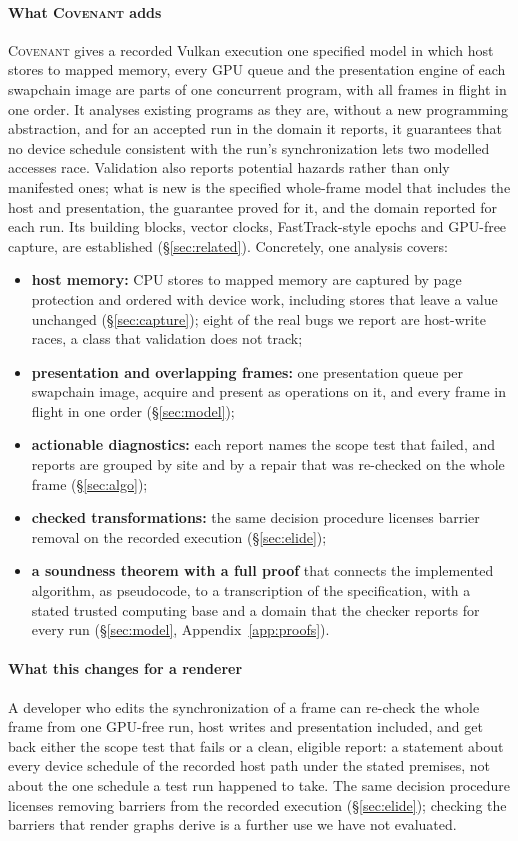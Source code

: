 \documentclass[acmtog,anonymous,review]{acmart}
\newcommand{\sys}{\textsc{Covenant}\xspace}
\begin{document}
\paragraph{What \sys adds}
\sys gives a recorded Vulkan execution one specified model in which host stores to mapped memory, every GPU queue
and the presentation engine of each swapchain image are parts of one concurrent program, with all frames in flight
in one order. It analyses existing programs as they are, without a new programming abstraction, and for an accepted
run in the domain it reports, it guarantees that no device schedule consistent with the run's synchronization lets
two modelled accesses race. Validation also reports potential hazards rather than only manifested ones; what is new
is the specified whole-frame model that includes the host and presentation, the guarantee proved for it, and the
domain reported for each run. Its building blocks, vector clocks, FastTrack-style epochs and GPU-free capture, are
established (\S\ref{sec:related}). Concretely, one analysis covers:
\begin{itemize}
\item \textbf{host memory:} CPU stores to mapped memory are captured by page protection and ordered with device
  work, including stores that leave a value unchanged (\S\ref{sec:capture}); eight of the real bugs we report are
  host-write races, a class that validation does not track;
\item \textbf{presentation and overlapping frames:} one presentation queue per swapchain image, acquire and present
  as operations on it, and every frame in flight in one order (\S\ref{sec:model});
\item \textbf{actionable diagnostics:} each report names the scope test that failed, and reports are grouped by site
  and by a repair that was re-checked on the whole frame (\S\ref{sec:algo});
\item \textbf{checked transformations:} the same decision procedure licenses barrier removal on the recorded
  execution (\S\ref{sec:elide});
\item \textbf{a soundness theorem with a full proof} that connects the implemented algorithm, as pseudocode, to a
  transcription of the specification, with a stated trusted computing base and a domain that the checker reports for
  every run (\S\ref{sec:model}, Appendix~\ref{app:proofs}).
\end{itemize}

\paragraph{What this changes for a renderer}
A developer who edits the synchronization of a frame can re-check the whole frame from one GPU-free run, host writes
and presentation included, and get back either the scope test that fails or a clean, eligible report: a statement
about every device schedule of the recorded host path under the stated premises, not about the one schedule a test
run happened to take. The same decision procedure licenses removing barriers from the recorded execution
(\S\ref{sec:elide}); checking the barriers that render graphs derive is a further use we have not evaluated.
\end{document}
